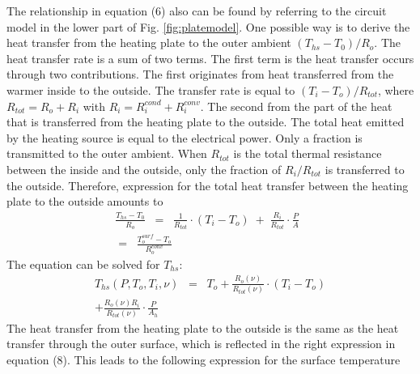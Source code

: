 The relationship in equation (6) also can be found by referring to the circuit model in the lower part of Fig. \ref{fig:platemodel}. One possible way is to derive the heat transfer from the heating plate to the outer ambient \((T_{hs}-T_0)/R_o\). The heat transfer rate is a sum of two terms. The first term is the heat transfer occurs through two contributions. The first originates from heat transferred from the warmer inside to the outside. The transfer rate is equal to \((T_i - T_o)/R_{tot}\), where \(R_{tot} = R_o + R_i\) with \(R_i = R_i^{cond} + R_i^{conv}\). The second from the part of the heat that is transferred from the heating plate to the outside. The total heat emitted by the heating source is equal to the electrical power. Only a fraction is transmitted to the outer ambient. When \(R_{tot}\) is the total thermal resistance between the inside and the outside, only the fraction of \(R_i/R_{tot}\) is transferred to the outside. Therefore, expression for the total heat transfer between the heating plate to the outside amounts to
\begin{multline}
\frac{T_{hs}-T_0}{R_o} \;\; = \;\; \frac{1}{R_{tot}}\cdot (T_i - T_o)\; + \;\frac{R_i}{R_{tot}}\cdot \frac{P}{A}  \;\; \\
= \;\; \frac{T_o^{surf}-T_o}{R_o^{conv}}
\end{multline}
The equation can be solved for \(T_{hs}\):
\begin{multline}
T_{hs}(P,T_o,T_i,\nu) \;\; = \;\; T_o + \frac{R_o(\nu)}{R_{tot}(\nu)}\cdot (T_i - T_o) \\
+ \frac{R_o(\nu)R_i}{R_{tot}(\nu)}\cdot \frac{P}{A_h}
\end{multline}
The heat transfer from the heating plate to the outside is the same as the heat transfer through the outer surface, which is reflected in the right expression in equation (8). This leads to the following expression for the surface temperature
